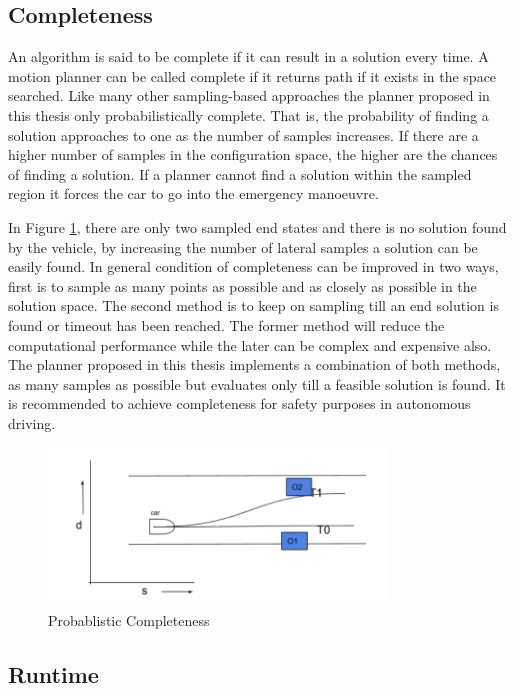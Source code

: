 \subsection{Completeness}
\label{completeness}
An algorithm is said to be complete if it can result in a solution every time. A motion planner can be called complete if it returns path if it exists in the space searched. Like many other sampling-based approaches the planner proposed in this thesis only probabilistically complete. That is, the probability of finding a solution approaches to one as the number of samples increases. If there are a higher number of samples in the configuration space, the higher are the chances of finding a solution. If a planner cannot find a solution within the sampled region it forces the car to go into the emergency manoeuvre. 

In Figure \ref{probablistically_complete}, there are only two sampled end states and there is no solution found by the vehicle, by increasing the number of lateral samples a solution can be easily found. In general condition of completeness can be improved in two ways, first is to sample as many points as possible and as closely as possible in the solution space. The second method is to keep on sampling till an end solution is found or timeout has been reached. The former method will reduce the computational performance while the later can be complex and expensive also. The planner proposed in this thesis implements a combination of both methods, as many samples as possible but evaluates only till a feasible solution is found. It is recommended to achieve completeness for safety purposes in autonomous driving. 

 \begin{figure}[h]
    \centering
    \includegraphics[width=0.8\textwidth]{Images/probablistically_complete.png}
    \caption{Probablistic Completeness}
    \label{probablistically_complete}
\end{figure}

\subsection{Runtime}

